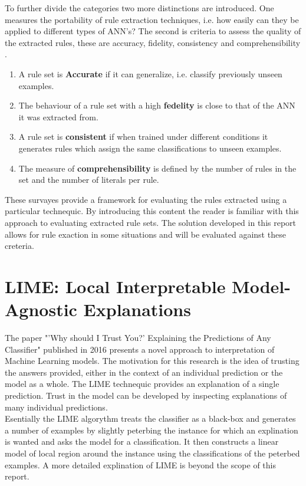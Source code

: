 To further divide the categories two more distinctions are introduced. One measures the portability of rule extraction techniques, i.e. how easily can they be applied to different types of ANN's? The second is criteria to assess the quality of the extracted rules, these are accuracy, fidelity, consistency and comprehensibility \cite{andrews1995survey}.

\begin{enumerate}
\item A rule set is \textbf{Accurate} if it can generalize, i.e. classify previously unseen examples.
\item The behaviour of a rule set with a high \textbf{fedelity} is close to that of the ANN it was extracted from.
\item A rule set is \textbf{consistent} if when trained under different conditions it generates rules which assign the same classifications to unseen examples.
\item The measure of \textbf{comprehensibility} is defined by the number of rules in the set and the number of literals per rule.
\end{enumerate}

These survayes provide a framework for evaluating the rules extracted using a particular technequic. By introducing this content the reader is familiar with this approach to evaluating extracted rule sets. The solution developed in this report allows for rule exaction in some situations and will be evaluated against these creteria. 

\section{LIME: Local Interpretable Model-Agnostic Explanations}
The paper "'Why should I Trust You?' Explaining the Predictions of Any Classifier" \cite{ribeiro2016should} published in 2016 presents a novel approach to interpretation of Machine Learning models. The motivation for this research is the idea of trusting the answers provided, either in the context of an individual prediction or the model as a whole. The LIME technequic provides an explanation of a single prediction. Trust in the model can be developed by inspecting explanations of many individual predictions.\\

Esentially the LIME algorythm treats the classifier as a black-box and generates a number of examples by slightly peterbing the instance for which an explination is wanted and asks the model for a classification. It then constructs a linear model of local region around the instance using the classifications of the peterbed examples. A more detailed explination of LIME is beyond the scope of this report.

